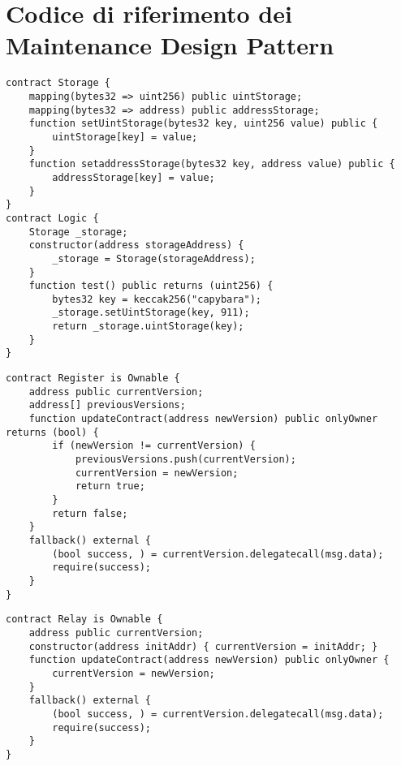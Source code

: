 {\section{Codice di riferimento dei Maintenance Design Pattern}

{\label{appendix:data_segregation}\begin{lstlisting}[language=Solidity, caption={Codice di riferimento per Data Segregation}]
contract Storage {
	mapping(bytes32 => uint256) public uintStorage;
	mapping(bytes32 => address) public addressStorage;
	function setUintStorage(bytes32 key, uint256 value) public {
		uintStorage[key] = value;
	}
	function setaddressStorage(bytes32 key, address value) public {
		addressStorage[key] = value;
	}
}
contract Logic {
	Storage _storage;
	constructor(address storageAddress) {
		_storage = Storage(storageAddress);
	}
	function test() public returns (uint256) {
		bytes32 key = keccak256("capybara");
		_storage.setUintStorage(key, 911);
		return _storage.uintStorage(key);
	}
}
\end{lstlisting}}

{\label{appendix:register}\begin{lstlisting}[language=Solidity, caption={Codice di riferimento per Register}]
contract Register is Ownable {
	address public currentVersion;
	address[] previousVersions;
	function updateContract(address newVersion) public onlyOwner returns (bool) {
		if (newVersion != currentVersion) {
			previousVersions.push(currentVersion);
			currentVersion = newVersion;
			return true;
		}
		return false;
	}
	fallback() external {
		(bool success, ) = currentVersion.delegatecall(msg.data);
		require(success);
	}
}
\end{lstlisting}}

{\label{appendix:relay}\begin{lstlisting}[language=Solidity, caption={Codice di riferimento per Relay}]
contract Relay is Ownable {
	address public currentVersion;
	constructor(address initAddr) { currentVersion = initAddr; }
	function updateContract(address newVersion) public onlyOwner {
		currentVersion = newVersion;
	}
	fallback() external {
		(bool success, ) = currentVersion.delegatecall(msg.data);
		require(success);
	}
}
\end{lstlisting}}
}
